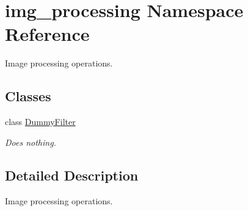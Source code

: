 \hypertarget{namespaceimg__processing}{}\section{img\+\_\+processing Namespace Reference}
\label{namespaceimg__processing}


Image processing operations.  


\subsection*{Classes}
\begin{DoxyCompactItemize}
\item 
class \mbox{\hyperlink{classimg__processing_1_1_dummy_filter}{Dummy\+Filter}}
\begin{DoxyCompactList}\small\item\em Does nothing. \end{DoxyCompactList}\end{DoxyCompactItemize}


\subsection{Detailed Description}
Image processing operations. 